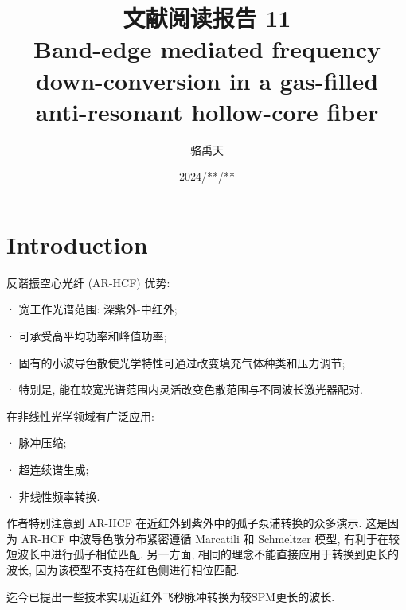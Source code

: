 \documentclass[14pt,a4paper,oneside]{article}
\title{\textbf{文献阅读报告 11\\Band-edge mediated frequency down-conversion in a gas-filled anti-resonant hollow-core fiber\cite{gavaraBandedgeMediatedFrequency2020}}}                           %
\author{骆禹天}                                           %
\date{2024/**/**}                                        %
\begin{document}

\maketitle

\setcounter{page}{1}          %


\tableofcontents              %

\newpage
\setcounter{page}{1}          %







\section{Introduction}

反谐振空心光纤 (AR-HCF) 优势:

· 宽工作光谱范围: 深紫外-中红外\cite{xiePhotonicsMeetsTopology2018, yuAttenuationLimitSilicabased2019};

· 可承受高平均功率和峰值功率\cite{debordMultimeterFiberdeliveryPulse2014};

· 固有的小波导色散使光学特性可通过改变填充气体种类和压力调节\cite{xuUltraslowWeaklightSolitons2017};

· 特别是, 能在较宽光谱范围内灵活改变色散范围与不同波长激光器配对.

在非线性光学领域有广泛应用:

· 脉冲压缩\cite{xuUltraslowWeaklightSolitons2017};

· 超连续谱生成\cite{jacobsonGlobalAreasLow2019};

· 非线性频率转换\cite{belliHighlyEfficientDeep2019}.

作者特别注意到 AR-HCF 在近红外到紫外中的孤子泵浦转换的众多演示\cite{jolyBrightSpatiallyCoherent2011a, kottigModulationalinstabilityfreePulseCompression2020, cimekSynthesisConditionsZBLAN2018}. 这是因为 AR-HCF 中波导色散分布紧密遵循 Marcatili 和 Schmeltzer 模型\cite{marcatiliHollowMetallicDielectric1964a}, 有利于在较短波长中进行孤子相位匹配. 另一方面, 相同的理念不能直接应用于转换到更长的波长, 因为该模型不支持在红色侧进行相位匹配. 

迄今已提出一些技术实现近红外飞秒脉冲转换为较SPM更长的波长. 
\end{document}
